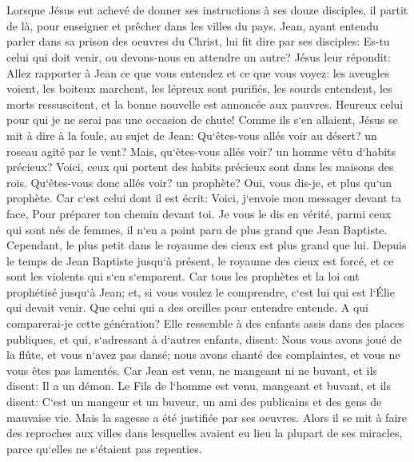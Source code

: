 \chapter{}

\verse Lorsque Jésus eut achevé de donner ses instructions à ses douze disciples, il partit de là, pour enseigner et prêcher dans les villes du pays. 
\verse Jean, ayant entendu parler dans sa prison des oeuvres du Christ, lui fit dire par ses disciples: 
\verse Es-tu celui qui doit venir, ou devons-nous en attendre un autre? 
\verse Jésus leur répondit: Allez rapporter à Jean ce que vous entendez et ce que vous voyez: 
\verse les aveugles voient, les boiteux marchent, les lépreux sont purifiés, les sourds entendent, les morts ressuscitent, et la bonne nouvelle est annoncée aux pauvres. 
\verse Heureux celui pour qui je ne serai pas une occasion de chute! 
\verse Comme ils s`en allaient, Jésus se mit à dire à la foule, au sujet de Jean: Qu`êtes-vous allés voir au désert? un roseau agité par le vent? 
\verse Mais, qu`êtes-vous allés voir? un homme vêtu d`habits précieux? Voici, ceux qui portent des habits précieux sont dans les maisons des rois. 
\verse Qu`êtes-vous donc allés voir? un prophète? Oui, vous dis-je, et plus qu`un prophète. 
\verse Car c`est celui dont il est écrit: Voici, j`envoie mon messager devant ta face, Pour préparer ton chemin devant toi. 
\verse Je vous le dis en vérité, parmi ceux qui sont nés de femmes, il n`en a point paru de plus grand que Jean Baptiste. Cependant, le plus petit dans le royaume des cieux est plus grand que lui. 
\verse Depuis le temps de Jean Baptiste jusqu`à présent, le royaume des cieux est forcé, et ce sont les violents qui s`en s`emparent. 
\verse Car tous les prophètes et la loi ont prophétisé jusqu`à Jean; 
\verse et, si vous voulez le comprendre, c`est lui qui est l`Élie qui devait venir. 
\verse Que celui qui a des oreilles pour entendre entende. 
\verse A qui comparerai-je cette génération? Elle ressemble à des enfants assis dans des places publiques, et qui, s`adressant à d`autres enfants, 
\verse disent: Nous vous avons joué de la flûte, et vous n`avez pas dansé; nous avons chanté des complaintes, et vous ne vous êtes pas lamentés. 
\verse Car Jean est venu, ne mangeant ni ne buvant, et ils disent: Il a un démon. 
\verse Le Fils de l`homme est venu, mangeant et buvant, et ils disent: C`est un mangeur et un buveur, un ami des publicains et des gens de mauvaise vie. Mais la sagesse a été justifiée par ses oeuvres. 
\verse Alors il se mit à faire des reproches aux villes dans lesquelles avaient eu lieu la plupart de ses miracles, parce qu`elles ne s`étaient pas repenties. 
